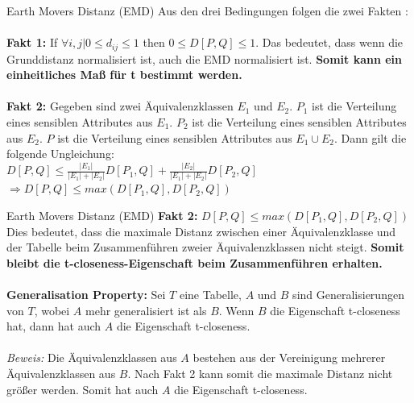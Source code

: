 \begin{frame}{Earth Movers Distanz (EMD)}
	Aus den drei Bedingungen folgen die zwei Fakten \cite{Li2007t-closseness}:\\
	\ \\
	\textbf{Fakt 1:} If $\forall i,j | 0 \le d_{ij} \le 1$ then $0 \le D[P,Q]  \le 1$. 
	Das bedeutet, dass wenn die Grunddistanz normalisiert ist, auch die EMD normalisiert ist. \textbf{Somit kann ein einheitliches Maß für t bestimmt werden.}\\
	\ \\
	\textbf{Fakt 2:} Gegeben sind zwei Äquivalenzklassen $E_1$ und $E_2$.
	$P_1$ ist die Verteilung eines sensiblen Attributes aus $E_1$.
	$P_2$ ist die Verteilung eines sensiblen Attributes aus $E_2$.
	$P$ ist die Verteilung eines sensiblen Attributes aus $E_1 \cup E_2$. Dann gilt die folgende Ungleichung: \\
	$D[P,Q] \le \frac{|E_1|}{|E_1|+|E_2|}D[P_1,Q] + \frac{|E_2|}{|E_1|+|E_2|}D[P_2,Q]$\\
	$\Rightarrow D[P,Q] \le max(D[P_1,Q], D[P_2,Q])$ 
\end{frame}

\begin{frame}{Earth Movers Distanz (EMD)}
	\textbf{Fakt 2:} $D[P,Q] \le max(D[P_1,Q], D[P_2,Q])$ 
	Dies bedeutet, dass die maximale Distanz zwischen einer Äquivalenzklasse und der Tabelle beim Zusammenführen zweier Äquivalenzklassen nicht steigt. \textbf{Somit bleibt die t-closeness-Eigenschaft beim Zusammenführen erhalten.} \\ 
	\ \\
	\textbf{Generalisation Property:} Sei $T$ eine Tabelle, $A$ und $B$ sind Generalisierungen von $T$, wobei $A$ mehr generalisiert ist als $B$. Wenn $B$ die Eigenschaft t-closeness hat, dann hat auch $A$ die Eigenschaft t-closeness.\\
	\ \\
	\textit{Beweis:} Die Äquivalenzklassen aus $A$ bestehen aus der Vereinigung mehrerer Äquivalenzklassen aus $B$. Nach Fakt 2 kann somit die maximale Distanz nicht größer werden. Somit hat auch $A$ die Eigenschaft t-closeness.  
\end{frame}
